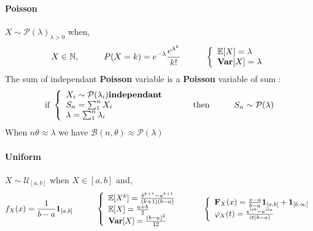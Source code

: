 \documentclass[a4paper,10pt]{article}
\begin{document}
\paragraph{Poisson} $X\sim \mathcal{P}(\lambda)_{\lambda>0}$ when,
\[
X \in \mathbb{N} , 
\hspace{10mm}
P(X=k)= e^{-\lambda}\frac{e^{\lambda^k}}{k!}
\hspace{10mm}
\left\{
\begin{array}{l}
\mathbb{E}[X]=\lambda \\
\textbf{Var}[X]=\lambda
\end{array}\right.
\]
The sum of independant \textbf{Poisson} variable is a \textbf{Poisson} variable of sum :
\[
\text{if  } 
\left\{
\begin{array}{l}
X_i \sim \mathcal{P}(\lambda_i) \textbf{independant} \\
S_n = \sum_{1}^{n} X_i \\
\lambda = \sum_{1}^{n} \lambda_i
\end{array}\right.
\hspace{10mm} \text{then} \hspace{10mm}
S_n \sim \mathcal{P}(\lambda)
\]
When $n\theta \approx \lambda$ we have $\mathcal{B}(n,\theta) \approx \mathcal{P}(\lambda)$

\paragraph{Uniform} $X\sim \mathcal{U}_{[a,b]}$ when $X \in [a,b]$ and,
\[
f_{X}(x) = \frac{1}{b-a}\mathbf{1}_{[a,b]}
\hspace{10mm}
\left\{
\begin{array}{l}
\mathbb{E}[X^k]=\frac{b^{k+1}-a^{k+1}}{(k+1)(b-a)} \\
\mathbb{E}[X]=\frac{a+b}{2} \\
\textbf{Var}[X]=\frac{(b-a)^2}{12} 
\end{array}\right.
\hspace{10mm}
\left\{
\begin{array}{l}
\textbf{F}_X(x) = \frac{x-a}{b-a}\mathbf{1}_{[a,b[} + \mathbf{1}_{[b,\infty[} \\
\varphi_{X}(t) = \frac{e^{itb}-e^{ita}}{it(b-a)}
\end{array}\right.
\]
\end{document}
